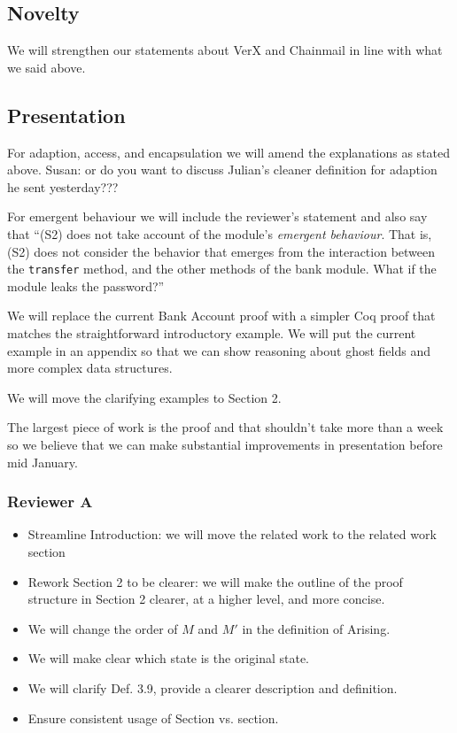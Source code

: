 \documentclass[11pt]{amsart}
\begin{document}
 \subsection*{Novelty}
 We will strengthen our statements about VerX and Chainmail in line with what we said above.
 
 \subsection*{Presentation}
 
 For adaption, access, and encapsulation we will amend the explanations as stated above. Susan: or do you want to discuss Julian's cleaner definition for adaption he sent yesterday???
 
 For emergent behaviour we will include the reviewer's statement and also say that ``(S2) does not take account of the module's \emph{emergent behaviour}. That is, (S2) does not consider the behavior that emerges from the interaction between the 
\texttt{transfer} method, and the other methods of the bank module. What if the module leaks the password?''
 
 We will replace the current Bank Account proof with a simpler Coq proof that matches the straightforward introductory example. We will put the current example in an appendix so that we can 
show reasoning about ghost fields and more complex data structures. 

We will move the clarifying examples to Section 2.

The largest piece of work is the proof and that shouldn't take more than a week so we believe that we can make substantial improvements in presentation before mid January.


\subsubsection*{Reviewer A}
\begin{itemize}
\item Streamline Introduction: we will move the related work to the related work section
\item Rework Section 2 to be clearer: we will make the outline of the proof structure in Section 2 clearer, at a higher level, and more concise.
\item We will change the order of $M$ and $M'$ in the definition of Arising.
\item We will make clear which state is the original state.
\item We will clarify Def. 3.9, provide a clearer description and definition.
\item Ensure consistent usage of Section vs. section.
\end{itemize}
\end{document}
